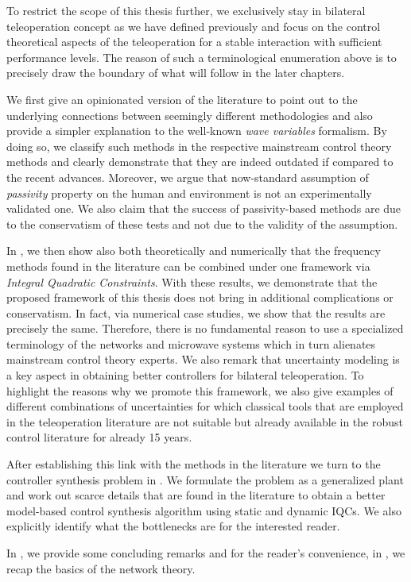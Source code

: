 To restrict the scope of this thesis further, we exclusively stay in bilateral teleoperation concept as we have defined previously and focus on the control theoretical aspects of the teleoperation for a stable interaction with sufficient performance levels. The reason of such a terminological enumeration above is to precisely draw the boundary of what will follow in the later chapters. 

We first give an opinionated version of the literature to point out to the underlying connections between seemingly different methodologies and also provide a simpler explanation to the well-known \emph{wave variables} formalism. By doing so, we classify such methods in the respective mainstream control theory methods and clearly demonstrate that they are indeed outdated if compared to the recent advances. Moreover, we argue that now-standard assumption of \emph{passivity} property on the human and environment is not an experimentally validated one. We also claim that the success of passivity-based methods are due to the conservatism of these tests and not due to the validity of the assumption.

In , we then show also both theoretically and numerically that the frequency methods found in the literature can be combined under one framework via \emph{Integral Quadratic Constraints}. With these results, we demonstrate that the proposed framework of this thesis does not bring in additional complications or conservatism. In fact, via numerical case studies, we show that the results are precisely the same. Therefore, there is no fundamental reason to use a specialized terminology of the networks and microwave systems which in turn alienates mainstream control theory experts. We also remark that uncertainty modeling is a key aspect in obtaining better controllers for bilateral teleoperation. To highlight the reasons why we promote this framework, we also give examples of different combinations of uncertainties for which classical tools that are employed in the teleoperation literature are not suitable but already available in the robust control literature for already 15 years. 


After establishing this link with the methods in the literature we turn to the controller synthesis problem in . We formulate the problem as a generalized plant and work out scarce details that are found in the literature to obtain a better model-based control synthesis algorithm using static and dynamic IQCs. We also explicitly identify what the bottlenecks are for the interested reader.  

In , we provide some concluding remarks and for the reader's convenience, in , we recap the basics of the network theory.

